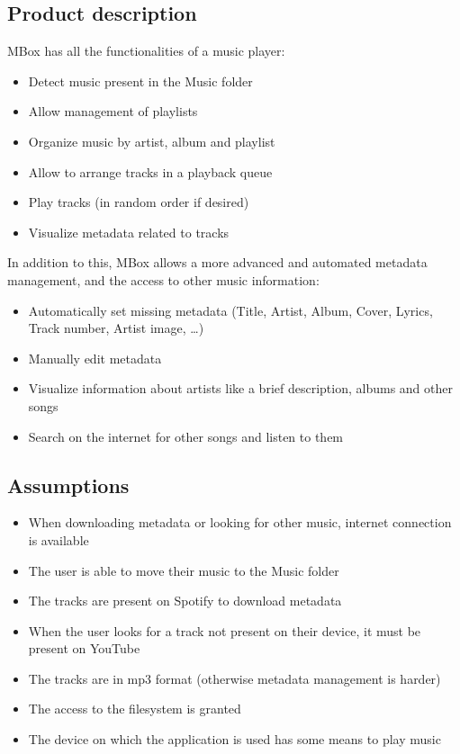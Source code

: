 \documentclass{article}
\begin{document}
\subsection{Product description}
MBox has all the functionalities of a music player:
\begin{itemize}
    \item Detect music present in the Music folder
    \item Allow management of playlists
    \item Organize music by artist, album and playlist
    \item Allow to arrange tracks in a playback queue
    \item Play tracks (in random order if desired)
    \item Visualize metadata related to tracks
\end{itemize}
In addition to this, MBox allows a more advanced and automated metadata
management, and the access to other music information:
\begin{itemize}
    \item Automatically set missing metadata (Title, Artist, Album, Cover,
        Lyrics, Track number, Artist image, \ldots)
    \item Manually edit metadata
    \item Visualize information about artists like a brief description, albums
        and other songs
    \item Search on the internet for other songs and listen to them
\end{itemize}

\subsection{Assumptions}
\begin{itemize}
    \item When downloading metadata or looking for other music, internet
        connection is available
    \item The user is able to move their music to the Music folder
    \item The tracks are present on Spotify to download metadata
    \item When the user looks for a track not present on their device, it must
        be present on YouTube
    \item The tracks are in mp3 format (otherwise metadata management is harder)
    \item The access to the filesystem is granted
    \item The device on which the application is used has some means to 
        play music
\end{itemize}
\end{document}
